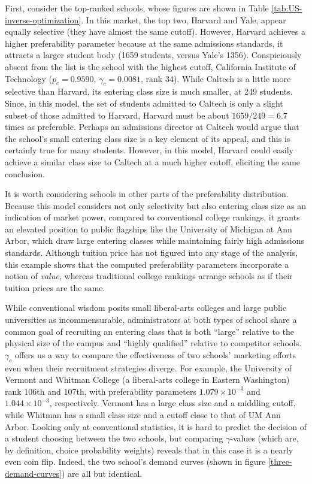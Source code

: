 \documentclass[12pt]{article}
\theoremstyle{definition}
\begin{document}
First, consider the top-ranked schools, whose figures are shown in Table \ref{tab:US-inverse-optimization}. In this market, the top two, Harvard and Yale, appear equally selective (they have almost the same cutoff). However, Harvard achieves a higher preferability parameter because at the same admissions standards, it attracts a larger student body (1659 students, versus Yale's 1356). Conspiciously absent from the list is the school with the highest cutoff, California Institute of Technology ($p_c = 0.9590$, $\gamma_c = 0.0081$, rank 34). While Caltech is a little more selective than Harvard, its entering class size is much smaller, at 249 students. Since, in this model, the set of students admitted to Caltech is only a slight subset of those admitted to Harvard, Harvard must be about $1659 / 249 = 6.7$ times as preferable. Perhaps an admissions director at Caltech would argue that the school's small entering class size is a key element of its appeal, and this is certainly true for many students. However, in this model, Harvard could easily achieve a similar class size to Caltech at a much higher cutoff, eliciting the same conclusion.

It is worth considering schools in other parts of the preferability distribution. Because this model considers not only selectivity but also entering class size as an indication of market power, compared to conventional college rankings, it grants an elevated position to public flagships like the University of Michigan at Ann Arbor, which draw large entering classes while maintaining fairly high admissions standards. Although tuition price has not figured into any stage of the analysis, this example shows that the computed preferability parameters incorporate a notion of \emph{value,} whereas traditional college rankings arrange schools as if their tuition prices are the same.

While conventional wisdom posits small liberal-arts colleges and large public universities as incommensurable, administrators at both types of school share a common goal of recruiting an entering class that is both ``large'' relative to the physical size of the campus and ``highly qualified'' relative to competitor schools. $\gamma_c$ offers us a way to compare the effectiveness of two schools' marketing efforts even when their recruitment strategies diverge. For example, the University of Vermont and Whitman College (a liberal-arts college in Eastern Washington) rank 106th and 107th, with preferability parameters $1.079 \times 10^{-3}$ and $1.044 \times 10^{-3}$, respectively. Vermont has a large class size and a middling cutoff, while Whitman has a small class size and a cutoff close to that of UM Ann Arbor. Looking only at conventional statistics, it is hard to predict the decision of a student choosing between the two schools, but comparing $\gamma$-values (which are, by definition, choice probability weights) reveals that in this case it is a nearly even coin flip. Indeed, the two school's demand curves (shown in figure \ref{three-demand-curves}) are all but identical. 
\end{document}
